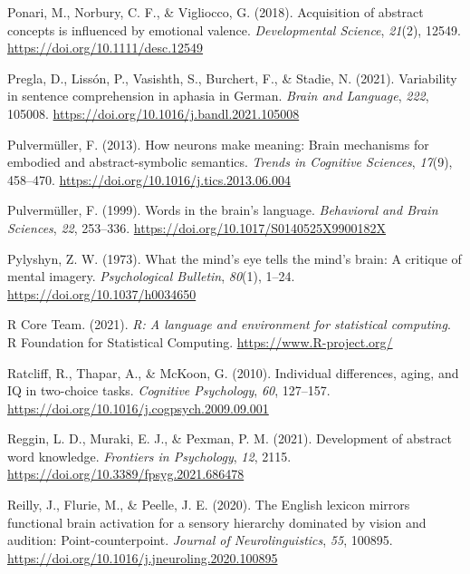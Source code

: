 \documentclass[
  12pt,
  man,floatsintext]{apa7}
\newlength{\cslhangindent}
\newlength{\cslentryspacingunit} %
\newenvironment{CSLReferences}[2] %
 {%
  \setlength{\parindent}{0pt}
  \ifodd #1
  \let\oldpar\par
  \def\par{\hangindent=\cslhangindent\oldpar}
  \fi
  \setlength{\parskip}{#2\cslentryspacingunit}
 }%
 {}
\begin{document}
\begin{CSLReferences}{1}{0}
\leavevmode{}%
Ponari, M., Norbury, C. F., \& Vigliocco, G. (2018). Acquisition of abstract concepts is influenced by emotional valence. \emph{Developmental Science}, \emph{21}(2), 12549. \url{https://doi.org/10.1111/desc.12549}

\leavevmode{}%
Pregla, D., Lissón, P., Vasishth, S., Burchert, F., \& Stadie, N. (2021). Variability in sentence comprehension in aphasia in {German}. \emph{Brain and Language}, \emph{222}, 105008. \url{https://doi.org/10.1016/j.bandl.2021.105008}

\leavevmode{}%
Pulvermüller, F. (2013). How neurons make meaning: {Brain} mechanisms for embodied and abstract-symbolic semantics. \emph{Trends in Cognitive Sciences}, \emph{17}(9), 458--470. \url{https://doi.org/10.1016/j.tics.2013.06.004}

\leavevmode{}%
Pulvermüller, F. (1999). Words in the brain's language. \emph{Behavioral and Brain Sciences}, \emph{22}, 253--336. \url{https://doi.org/10.1017/S0140525X9900182X}

\leavevmode{}%
Pylyshyn, Z. W. (1973). What the mind's eye tells the mind's brain: {A} critique of mental imagery. \emph{Psychological Bulletin}, \emph{80}(1), 1--24. \url{https://doi.org/10.1037/h0034650}

\leavevmode{}%
R Core Team. (2021). \emph{R: A language and environment for statistical computing}. R Foundation for Statistical Computing. \url{https://www.R-project.org/}

\leavevmode{}%
Ratcliff, R., Thapar, A., \& McKoon, G. (2010). Individual differences, aging, and {IQ} in two-choice tasks. \emph{Cognitive Psychology}, \emph{60}, 127--157. \url{https://doi.org/10.1016/j.cogpsych.2009.09.001}

\leavevmode{}%
Reggin, L. D., Muraki, E. J., \& Pexman, P. M. (2021). Development of abstract word knowledge. \emph{Frontiers in Psychology}, \emph{12}, 2115. \url{https://doi.org/10.3389/fpsyg.2021.686478}

\leavevmode{}%
Reilly, J., Flurie, M., \& Peelle, J. E. (2020). The {English} lexicon mirrors functional brain activation for a sensory hierarchy dominated by vision and audition: {Point-counterpoint}. \emph{Journal of Neurolinguistics}, \emph{55}, 100895. \url{https://doi.org/10.1016/j.jneuroling.2020.100895}


\end{CSLReferences}
\end{document}
